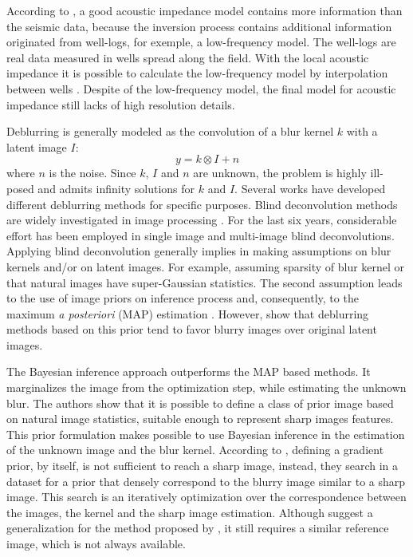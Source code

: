 \documentclass[conference]{IEEEtran}
\begin{document}
According to \cite{Latimer2017}, a good acoustic impedance model contains more information
than the seismic data, because the inversion process contains additional information originated from well-logs, for
exemple, a low-frequency model.
The well-logs are real data measured in wells spread along the field.
With the local acoustic impedance it is possible to calculate the low-frequency
model by interpolation between wells \cite{Buland2003,Figueiredo2012}. Despite of the
low-frequency model, the final model for acoustic impedance still lacks of high resolution details.

Deblurring is generally modeled as the convolution of a blur kernel $k$
with a latent image $I$: 
\begin{equation}
 y = k \otimes I + n
 \label{eq:deblurr}
\end{equation}
where $n$ is the noise. Since $k$, $I$ and $n$ are unknown, the problem 
is highly ill-posed and admits infinity solutions for $k$ and $I$.
Several works have developed different deblurring methods for specific purposes.
Blind deconvolution methods are widely investigated in image processing \cite{Bishop2007}.
For the last six years, considerable effort has been employed in single image
\cite{Babacan2012,Krishnan2015,Levin2011,Zhang2011} and multi-image \cite{sroubek2012,Zhu2012} blind deconvolutions. 
Applying blind deconvolution generally implies in making assumptions on
blur kernels and/or on latent images. For example, assuming sparsity of blur kernel
or that natural images have super-Gaussian statistics. The second assumption
leads to the use of image priors on inference process and, consequently, to the maximum \textit{a posteriori}
(MAP) estimation \cite{Babacan2012}. However, \cite{Levin} show that deblurring methods
based on this prior tend to favor blurry images over original latent images.

The Bayesian inference approach \cite{Levin} outperforms the MAP based methods. It marginalizes
the image from the optimization step, while estimating the unknown blur.
The authors show that it is possible to define a class of prior image
based on natural image statistics, suitable enough to represent sharp images features.
This prior formulation makes possible to use Bayesian inference in the estimation of the
unknown image and the blur kernel. According to \cite{Hacohen13}, defining a gradient
prior, by itself, is not sufficient to reach a sharp image, instead,
they search in a dataset for a prior that densely correspond to
the blurry image similar to a sharp image. This search is an
iteratively optimization over the correspondence between the images, the kernel and
the sharp image estimation. Although \cite{Pan2014} suggest a generalization
for the method proposed by \cite{Hacohen13}, it still requires a similar reference image,
which is not always available.
\end{document}
